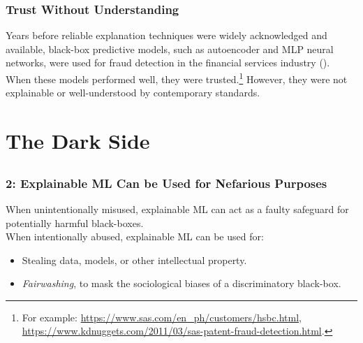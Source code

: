 \documentclass[11pt,aspectratio=169,hyperref={colorlinks}]{beamer}
\begin{document}
	\begin{frame}
	
		\frametitle{Trust Without Understanding}
		\Large
		Years before reliable explanation techniques were widely acknowledged and available, black-box predictive models, such as autoencoder and MLP neural networks, were used for fraud detection in the financial services industry (\citet{gopinathan1998fraud}). When these models performed well, they were trusted.\footnote{\tiny{For example: \url{https://www.sas.com/en_ph/customers/hsbc.html}, \url{https://www.kdnuggets.com/2011/03/sas-patent-fraud-detection.html}}.} However, they were not explainable or well-understood by contemporary standards.  

	\end{frame}


	\section{The Dark Side}

	\subsection*{} %

	\begin{frame}
	
		\frametitle{2: Explainable ML Can be Used for \textbf{Nefarious Purposes}}	
		\Large
		When unintentionally misused, explainable ML can act as a faulty safeguard for potentially harmful black-boxes.\\
		\vspace{10pt}
		When intentionally abused, explainable ML can be used for: 
		\begin{itemize}
			\item Stealing data, models, or other intellectual property.
			\item \textit{Fairwashing}, to mask the sociological biases of a discriminatory black-box.
		\end{itemize}
	
	\end{frame}
\end{document}
